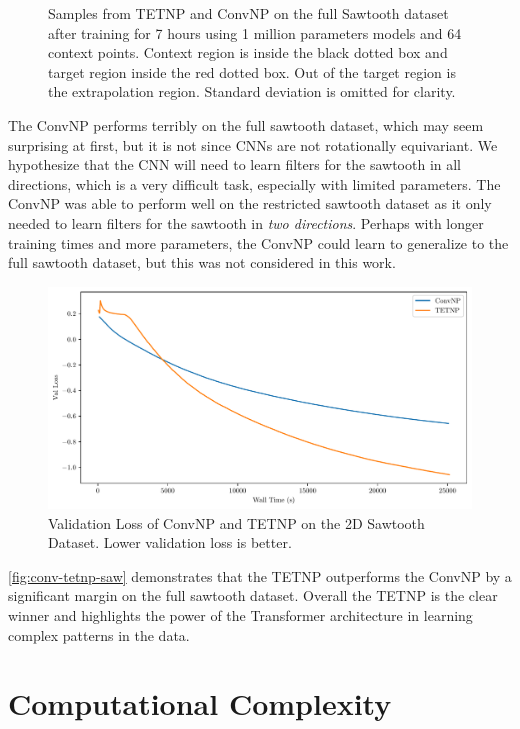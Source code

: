 \documentclass[../../main.tex]{subfiles}
\begin{document}
\begin{figure}[H]
    \caption{Samples from TETNP and ConvNP on the full Sawtooth dataset after training for 7 hours using 1 million parameters models and 64 context points. Context region is inside the black dotted box and target region inside the red dotted box. Out of the target region is the extrapolation region. Standard deviation is omitted for clarity.}
    \label{fig:full-saw-preds}
\end{figure}

The ConvNP performs terribly on the full sawtooth dataset, which may seem surprising at first, but it is not since CNNs are not rotationally equivariant. We hypothesize that the CNN will need to learn filters for the sawtooth in all directions, which is a very difficult task, especially with limited parameters. The ConvNP was able to perform well on the restricted sawtooth dataset as it only needed to learn filters for the sawtooth in \emph{two directions}. Perhaps with longer training times and more parameters, the ConvNP could learn to generalize to the full sawtooth dataset, but this was not considered in this work.



\begin{figure}[H]
    \centering
    \includegraphics[width=0.6\linewidth]{./fig/conv-tetnp-saw.pdf}
    \caption{Validation Loss of ConvNP and TETNP on the 2D Sawtooth Dataset. Lower validation loss is better.}
    \label{fig:conv-tetnp-saw}
\end{figure}

\autoref{fig:conv-tetnp-saw} demonstrates that the TETNP outperforms the ConvNP by a significant margin on the full sawtooth dataset. Overall the TETNP is the clear winner and highlights the power of the Transformer architecture in learning complex patterns in the data.



\section{Computational Complexity}
\end{document}
